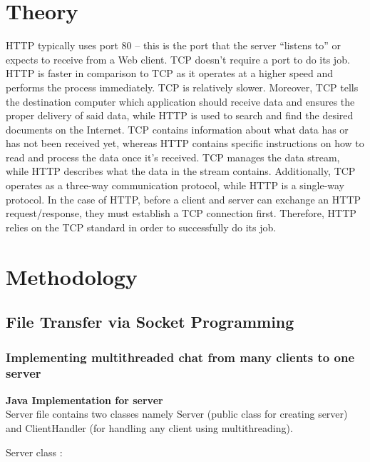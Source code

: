 \documentclass[11pt]{article}
\begin{document}
\section{Theory}

HTTP typically uses port 80 – this is the port that the server “listens to” or expects to receive from a Web client. TCP doesn’t require a port to do its job. HTTP is faster in comparison to TCP as it operates at a higher speed and performs the process immediately. TCP is relatively slower. Moreover, TCP tells the destination computer which application should receive data and ensures the proper delivery of said data, while HTTP is used to search and find the desired documents on the Internet. TCP contains information about what data has or has not been received yet, whereas HTTP contains specific instructions on how to read and process the data once it’s received. TCP manages the data stream, while HTTP describes what the data in the stream contains. Additionally, TCP operates as a three-way communication protocol, while HTTP is a single-way protocol. In the case of HTTP, before a client and server can exchange an HTTP request/response, they must establish a TCP connection first. Therefore, HTTP relies on the TCP standard in order to successfully do its job.


\section{Methodology}


\subsection{File Transfer via Socket Programming }

\subsubsection{Implementing multithreaded chat from many clients to one server}
\textbf{Java Implementation for server}\\[12pt]

Server file contains two classes namely Server (public class for creating server) and ClientHandler (for handling any client using multithreading).

\vspace{.5cm}
Server class : 
\vspace{.5cm}
\end{document}
